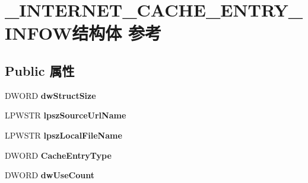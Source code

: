 \hypertarget{struct___i_n_t_e_r_n_e_t___c_a_c_h_e___e_n_t_r_y___i_n_f_o_w}{}\section{\+\_\+\+I\+N\+T\+E\+R\+N\+E\+T\+\_\+\+C\+A\+C\+H\+E\+\_\+\+E\+N\+T\+R\+Y\+\_\+\+I\+N\+F\+O\+W结构体 参考}
\label{struct___i_n_t_e_r_n_e_t___c_a_c_h_e___e_n_t_r_y___i_n_f_o_w}
\subsection*{Public 属性}
\begin{DoxyCompactItemize}
\item 
\mbox{\label{struct___i_n_t_e_r_n_e_t___c_a_c_h_e___e_n_t_r_y___i_n_f_o_w_a8f018c8d583d6f37612859a56c7e1d23}} 
D\+W\+O\+RD {\bfseries dw\+Struct\+Size}
\item 
\mbox{\label{struct___i_n_t_e_r_n_e_t___c_a_c_h_e___e_n_t_r_y___i_n_f_o_w_a4be36afa80b2ba77559d34aa2bc29076}} 
L\+P\+W\+S\+TR {\bfseries lpsz\+Source\+Url\+Name}
\item 
\mbox{\label{struct___i_n_t_e_r_n_e_t___c_a_c_h_e___e_n_t_r_y___i_n_f_o_w_afa6b6dc8afef46c863f8020f975c76b2}} 
L\+P\+W\+S\+TR {\bfseries lpsz\+Local\+File\+Name}
\item 
\mbox{\label{struct___i_n_t_e_r_n_e_t___c_a_c_h_e___e_n_t_r_y___i_n_f_o_w_a24146fcabce130cdfdd63605f4e05926}} 
D\+W\+O\+RD {\bfseries Cache\+Entry\+Type}
\item 
\mbox{\label{struct___i_n_t_e_r_n_e_t___c_a_c_h_e___e_n_t_r_y___i_n_f_o_w_aef8e5b02e787d4b2f29a9ce9d197ecd2}} 
D\+W\+O\+RD {\bfseries dw\+Use\+Count}
\item 
\mbox{\label{struct___i_n_t_e_r_n_e_t___c_a_c_h_e___e_n_t_r_y___i_n_f_o_w_a6a7bf28723475a8c498fa95ef8512f99}} 

\end{DoxyCompactItemize}
